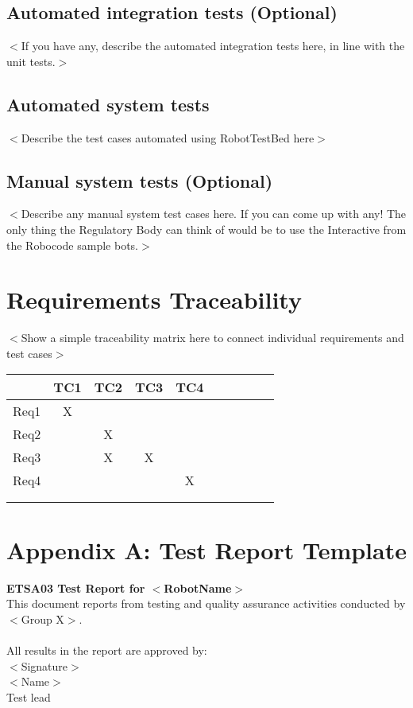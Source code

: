 \documentclass{scrreprt}
\begin{document}
\section{Automated integration tests (Optional)}
$<$If you have any, describe the automated integration tests here, in line with the unit tests.$>$

\section{Automated system tests}
$<$Describe the test cases automated using RobotTestBed here$>$

\section{Manual system tests (Optional)}
$<$Describe any manual system test cases here. If you can come up with any! The only thing the Regulatory Body can think of would be to use the Interactive from the Robocode sample bots.$>$

\chapter{Requirements Traceability}
$<$Show a simple traceability matrix here to connect individual requirements and test cases$>$

\begin{center}
    \begin{tabular}{|c|c|c|c|c|c|c|c|c|c|}
        \hline
         & TC1 & TC2 & TC3 & TC4& & & & \\
        \hline
	     Req1 & X & & & & & & & \\
        \hline
	     Req2 & & X & & & & & & \\
        \hline
        Req3 & & X & X & & & & & \\
        \hline
        Req4 & & & & X & & & & \\
        \hline
         & & & & & & & &\\
         \hline
          & & & & & & & &\\
         \hline
        
    \end{tabular}
\end{center}

\appendix
\chapter{Appendix A: Test Report Template}
\textbf{\LARGE{ETSA03 Test Report for $<$RobotName$>$}}\\
This document reports from testing and quality assurance activities conducted by $<$Group X$>$.
\\
\\
All results in the report are approved by:
\\
$<$Signature$>$\\
$<$Name$>$\\
Test lead
\end{document}
